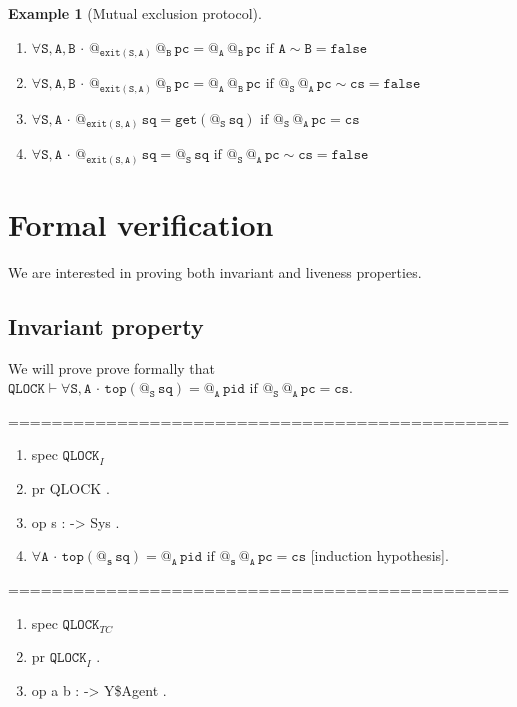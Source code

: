 \documentclass{article}
\makeatletter
\newcommand{\B}{\mathtt{B}}
\newcommand{\A}{\mathtt{A}}
\renewcommand{\S}{\mathtt{S}}
\newcommand{\s}{{\mathtt{s}}}
\newcommand{\pc}{{\mathtt{pc}}}
\newcommand{\pid}{{\mathtt{pid}}}
\newcommand{\sq}{{\mathtt{sq}}}
\newcommand{\cs}{{\mathtt{cs}}}
\newcommand{\QLOCK}{{\mathtt{QLOCK}}}
\newcommand{\Top}{{\mathtt{top}}}
\newcommand{\false}{{\mathtt{false}}}
\newcommand{\exit}{{\mathtt{exit}}}
\newcommand{\get}{{\mathtt{get}}}
\newcommand{\at}[1]{@_{#1}\,}
\newcommand{\Forall}[1]{\forall #1\,{\cdot}\,}
\newtheorem{example}{Example}
\newcounter{nr}
\makeatother
\begin{document}
\begin{example} [Mutual exclusion protocol]
\begin{enumerate}[label=(\arabic*),ref=\arabic*, leftmargin=*]
 \item \label{sen-16}$\Forall{\S, \A,\B}  \at{\exit(\S,\A) }\at{\B}\pc =  \at{\A }\at{\B}\pc \text{ if } \A \sim \B =\false$
 
 \item \label{sen-17}$\Forall{\S, \A,\B}  \at{\exit(\S,\A) }\at{\B}\pc =  \at{\A }\at{\B}\pc \text{ if } \at{\S} \at{\A} \pc \sim \cs = \false $
 
 \item \label{sen-18}$\Forall{\S,\A} \at{\exit(\S,\A)}\sq = \get (\at{\S}\sq) \text{ if } \at{\S}\at{\A} \pc = \cs$
 
  \item \label{sen-19}$\Forall{\S,\A} \at{\exit(\S,\A)}\sq = \at{\S}\sq \text{ if } \at{\S}\at{\A} \pc \sim \cs =\false$
  \setcounter{nr}{\value{enumi}}
 \end{enumerate}
 
 \end{example}

\section{Formal verification}

We are interested in proving both invariant and liveness properties.

\subsection{Invariant property}
We will prove prove formally that 
 $\QLOCK\vdash\Forall{\S,\A}\Top(\at{\S}\sq)=\at{\A}\pid\text{ if } \at{\S}\at{\A}\pc=\cs$.
 
 ==============================================
   \begin{enumerate}[label=(\arabic*),ref=\arabic*,leftmargin=*] \tt
   \setcounter{enumi}{\value{nr}}
   \item [] spec $\QLOCK_I$
   
   \item [] pr QLOCK .
   
   \item [] op s : -> Sys .
   
   \setcounter{enumi}{\value{nr}}
   \item  $\Forall{\A}\Top(\at{\s}\sq)=\at{\A}\pid\text{ if } \at{\s}\at{\A}\pc=\cs$ [induction hypothesis].
   \setcounter{nr}{\value{enumi}}
   \end{enumerate}
  
  ==============================================
  \begin{enumerate}[label=(\arabic*),ref=\arabic*,leftmargin=*] \tt
   \setcounter{enumi}{\value{nr}} 
   
    \item[] spec $\QLOCK_{TC}$
    
    \item[] pr $\QLOCK_I$ .
    
    \item[] op a b : -> Y\$Agent . 
    
   \end{enumerate}
   
\end{document}
